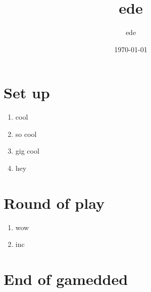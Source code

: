 \documentclass{article}%
\title{ede}%
\author{ede}%
\date{\today}%
\begin{document}
%
\pagestyle{empty}%
\normalsize%
\maketitle%
\section{ Set up
}%
\label{sec:Setup}%
\begin{enumerate}%
\item%
 cool
%
\item%
 so cool
%
\item%
 gig cool
%
\item%
 hey
%
\end{enumerate}

%
\section{ Round of play
}%
\label{sec:Roundofplay}%
\begin{enumerate}%
\item%
 wow
%
\item%
 inc
%
\end{enumerate}

%
\section{ End of gamedded}%
\label{sec:Endofgamedded}%

%
\end{document}

